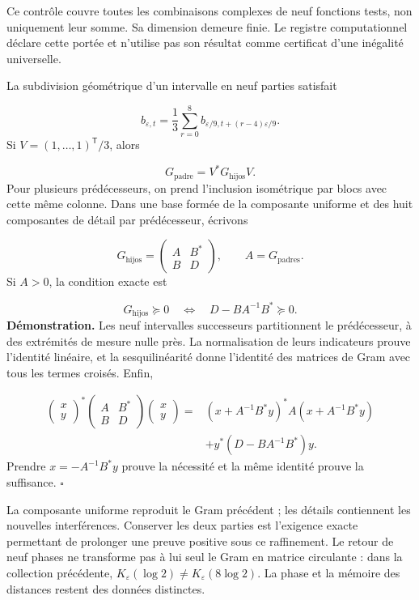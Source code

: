 Ce contrôle couvre toutes les combinaisons complexes de neuf fonctions tests, non uniquement leur somme. Sa dimension demeure finie. Le registre computationnel déclare cette portée et n’utilise pas son résultat comme certificat d’une inégalité universelle.

La subdivision géométrique d’un intervalle en neuf parties satisfait

\[
b_{\varepsilon,t}=\frac13\sum_{r=0}^8
b_{\varepsilon/9,t+(r-4)\varepsilon/9}.
\]
Si \(V=(1,\ldots,1)^{\mathsf T}/3\), alors

\[
G_{\mathrm{padre}}=V^*G_{\mathrm{hijos}}V.
\]
Pour plusieurs prédécesseurs, on prend l'inclusion isométrique par blocs avec cette même colonne. Dans une base formée de la composante uniforme et des huit composantes de détail par prédécesseur, écrivons

\[
G_{\mathrm{hijos}}=
\begin{pmatrix}A&B^*\\B&D\end{pmatrix},\qquad
A=G_{\mathrm{padres}}.
\]
Si \(A>0\), la condition exacte est

\[
G_{\mathrm{hijos}}\succeq0
\quad\Longleftrightarrow\quad D-BA^{-1}B^*\succeq0.
\]
\textbf{Démonstration.} Les neuf intervalles successeurs partitionnent le prédécesseur, à des extrémités de mesure nulle près. La normalisation de leurs indicateurs prouve l'identité linéaire, et la sesquilinéarité donne l'identité des matrices de Gram avec tous les termes croisés. Enfin,

\[
\begin{aligned}
\begin{pmatrix}x\\y\end{pmatrix}^*
\begin{pmatrix}A&B^*\\B&D\end{pmatrix}
\begin{pmatrix}x\\y\end{pmatrix}
={}&(x+A^{-1}B^*y)^*A(x+A^{-1}B^*y)\\
&+y^*(D-BA^{-1}B^*)y.
\end{aligned}
\]
Prendre \(x=-A^{-1}B^*y\) prouve la nécessité et la même identité prouve la suffisance. \hfill\(\square\)

La composante uniforme reproduit le Gram précédent ; les détails contiennent les nouvelles interférences. Conserver les deux parties est l'exigence exacte permettant de prolonger une preuve positive sous ce raffinement. Le retour de neuf phases ne transforme pas à lui seul le Gram en matrice circulante : dans la collection précédente, \(K_\varepsilon(\log2)\neq K_\varepsilon(8\log2)\). La phase et la mémoire des distances restent des données distinctes.

